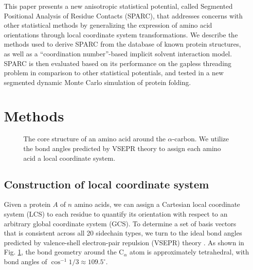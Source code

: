 \documentclass[11pt,titlepage]{article}
\begin{document}
This paper presents a new anisotropic statistical potential, called Segmented Positional Analysis of Residue Contacts (SPARC), that addresses concerns with other statistical methods by generalizing the expression of amino acid orientations through local coordinate system transformations.
We describe the methods used to derive SPARC from the database of known protein structures, as well as a ``coordination number''-based implicit solvent interaction model.
SPARC is then evaluated based on its performance on the gapless threading problem in comparison to other statistical potentials, and tested in a new segmented dynamic Monte Carlo simulation of protein folding.

\section{Methods}

\begin{figure}
	\begin{center}
	\end{center}
	\caption{The core structure of an amino acid around the $\alpha$-carbon. We utilize the bond angles predicted by VSEPR theory to assign each amino acid a local coordinate system.}
	\label{aminoacid_axes}
\end{figure}

\subsection{Construction of local coordinate system}
Given a protein $A$ of $n$ amino acids, we can assign a Cartesian local coordinate system (LCS) to each residue to quantify its orientation with respect to an arbitrary global coordinate system (GCS).
To determine a set of basis vectors that is consistent across all 20 sidechain types, we turn to the ideal bond angles predicted by valence-shell electron-pair repulsion (VSEPR) theory \cite{gillespie}.
As shown in Fig. \ref{aminoacid_axes}, the bond geometry around the C$_\alpha$ atom is approximately tetrahedral, with bond angles of $\cos^{-1}{1/3}\approx 109.5^\circ$.
\end{document}
